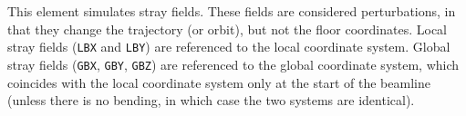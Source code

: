 This element simulates stray fields.  These fields are considered
perturbations, in that they change the trajectory (or orbit), but not
the floor coordinates.  Local stray fields ({\tt LBX} and {\tt LBY})
are referenced to the local coordinate system.  Global stray fields
({\tt GBX}, {\tt GBY}, {\tt GBZ}) are referenced to the global
coordinate system, which coincides with the local coordinate system
only at the start of the beamline (unless there is no bending, in
which case the two systems are identical).

